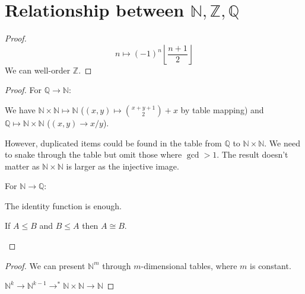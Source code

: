 \section{Relationship between \texorpdfstring{$\mathbb{N}, \mathbb{Z}, \mathbb{Q}$}{N, Z, Q}}

\begin{theorem}
\end{theorem}

\begin{proof}
$$n \mapsto (-1)^n\left\lfloor \frac{n+1}{2}\right\rfloor$$ We can well-order
\(\mathbb{Z}\).
\end{proof}

\begin{theorem}
\end{theorem}

\begin{proof}
For \(\mathbb{Q} \rightarrow \mathbb{N}\):

We have
\(\mathbb{N}\times \mathbb{N}\mapsto \mathbb{N}\)
(\((x,y) \mapsto \binom{x+y+1}{2} + x\) by table mapping) and
\(\mathbb{Q} \mapsto \mathbb{N}\times \mathbb{N}\)
(\((x,y) \rightarrow x/y\)).

However, duplicated items could be found in the table from
\(\mathbb{Q}\) to \(\mathbb{N}\times \mathbb{N}\). We need to snake through the
table but omit those where \(\gcd > 1\). The result doesn't matter as \(\mathbb{N}\times \mathbb{N}\) is larger as the injective image.

For \(\mathbb{N} \rightarrow \mathbb{Q}\):

The identity function is enough.

\begin{theorem}\label{th:shroeder}
If \(A \le B\) and \(B \le A\) then \(A \cong B\).
\end{theorem}

\end{proof}

\begin{theorem}
\end{theorem}

\begin{proof}
We can present \(\mathbb{N}^m\) through $m$-dimensional tables, where \(m\) is constant.

\(\mathbb{N}^k \rightarrow \mathbb{N}^{k-1} \rightarrow^* \mathbb{N}\times \mathbb{N} \rightarrow \mathbb{N}\)
\end{proof}
